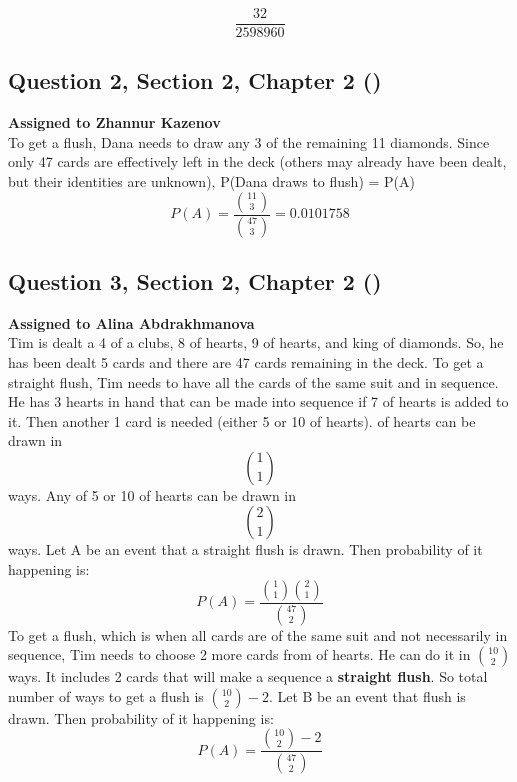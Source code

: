 \documentclass[12pt, a4paper]{article}
\begin{document}
    $$\frac{32}{2598960}$$

\subsection*{Question 2, Section 2, Chapter 2 (\cite{boyce11th})}

\noindent\textbf{Assigned to Zhannur Kazenov}\\

\noindent To get a flush, Dana needs to draw any 3 of the remaining 11 diamonds. Since only 47 cards are effectively left in the deck (others may already have been dealt, but their identities are unknown), 
\newline P(Dana draws to flush) = P(A)
\[
    P(A) =\frac{\binom{11}{3}}{\binom{47}{3}}=0.0101758
\]
\subsection*{Question 3, Section 2, Chapter 2 (\cite{boyce11th})}

\noindent\textbf{Assigned to Alina Abdrakhmanova}\\

\noindent Tim is dealt a 4 of a clubs, 8 of hearts, 9 of hearts, and king of diamonds. So, he has been dealt 5 cards and there are 47 cards remaining in the deck. To get a straight flush, Tim needs to have all the cards of the same suit and in sequence. He has 3 hearts in hand that can be made into sequence if 7 of hearts is added to it. Then another 1 card is needed (either 5 or 10 of hearts).  of hearts can be drawn in \begin{equation}
    \binom{1}{1}
\end{equation} ways. \newline
Any of 5 or 10 of hearts can be drawn in \begin{equation}
    \binom{2}{1}
\end{equation} ways. \newline
Let A be an event that a straight flush is drawn. \newline
Then probability of it happening is: \begin{equation}
    P(A) =\frac{\binom{1}{1}\binom{2}{1}}{\binom{47}{2}}
\end{equation} \newline
To get a flush, which is when all cards are of the same suit and not necessarily in sequence, Tim needs to choose 2 more cards from of hearts. He can do it in $\binom{10}{2}$ ways. It includes 2 cards that will make a sequence a \textbf{straight flush}. So total number of ways to get a flush is $\binom{10}{2}-2$. \newline
Let B be an event that flush is drawn.
Then probability of it happening is: \begin{equation}
    P(A) =\frac{\binom{10}{2}-2}{\binom{47}{2}}
\end{equation}
\end{document}
